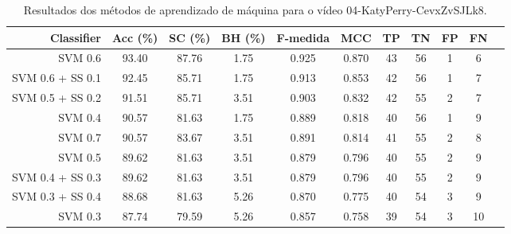 \begin{table}[!htb]
\centering
\caption{Resultados dos métodos de aprendizado de máquina para o vídeo 04-KatyPerry-CevxZvSJLk8.}
\label{tab:04-KatyPerry-CevxZvSJLk8}
\begin{tabular}{r|c|c|c|c|c|c|c|c|c|c}
\hline\hline
Classifier & Acc (\%) & SC (\%) & BH (\%) & F-medida & MCC & TP & TN & FP & FN \\ \hline
SVM 0.6 & 93.40 & 87.76 & 1.75 & 0.925 & 0.870 & 43 & 56 & 1 & 6 \\ 
SVM 0.6 + SS 0.1 & 92.45 & 85.71 & 1.75 & 0.913 & 0.853 & 42 & 56 & 1 & 7 \\ 
SVM 0.5 + SS 0.2 & 91.51 & 85.71 & 3.51 & 0.903 & 0.832 & 42 & 55 & 2 & 7 \\ 
SVM 0.4 & 90.57 & 81.63 & 1.75 & 0.889 & 0.818 & 40 & 56 & 1 & 9 \\ 
SVM 0.7 & 90.57 & 83.67 & 3.51 & 0.891 & 0.814 & 41 & 55 & 2 & 8 \\ 
SVM 0.5 & 89.62 & 81.63 & 3.51 & 0.879 & 0.796 & 40 & 55 & 2 & 9 \\ 
SVM 0.4 + SS 0.3 & 89.62 & 81.63 & 3.51 & 0.879 & 0.796 & 40 & 55 & 2 & 9 \\ 
SVM 0.3 + SS 0.4 & 88.68 & 81.63 & 5.26 & 0.870 & 0.775 & 40 & 54 & 3 & 9 \\ 
SVM 0.3 & 87.74 & 79.59 & 5.26 & 0.857 & 0.758 & 39 & 54 & 3 & 10 \\ 
\hline\hline
\end{tabular}
\end{table}
